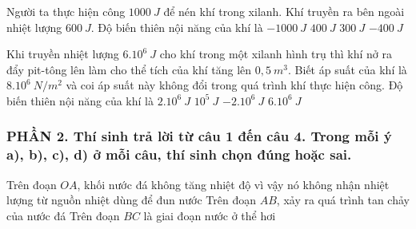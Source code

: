\begin{ex}
Người ta thực hiện công $1000\ J$ để nén khí trong xilanh. Khí truyền ra bên ngoài nhiệt lượng $600\ J$. Độ biến thiên nội năng của khí là
\choice
{$-1000\ J$}
{\True $400\ J$}
{$300\ J$}
{$-400\ J$}
\loigiai{}
\end{ex}

\begin{ex}
Khi truyền nhiệt lượng $6.10^{6}\ J$ cho khí trong một xilanh hình trụ thì khí nở ra đẩy pit-tông lên làm cho thể tích của khí tăng lên $0,5\ m^{3}$. Biết áp suất của khí là $8.10^{6}\ N/m^{2}$ và coi áp suất này không đổi trong quá trình khí thực hiện công. Độ biến thiên nội năng của khí là
\choice
{\True $2.10^{6}\ J$}
{$10^{5}\ J$}
{$-2.10^{6}\ J$}
{$6.10^{6}\ J$}
\loigiai{}
\end{ex}
\subsubsection*{PHẦN 2. Thí sinh trả lời từ câu 1 đến câu 4. Trong mỗi ý a), b), c), d) ở mỗi câu, thí sinh chọn đúng hoặc sai.}
\setcounter{ex}{0}
\begin{ex}
{Trên đoạn $OA$, khối nước đá không tăng nhiệt độ vì vậy nó không nhận nhiệt lượng từ nguồn nhiệt dùng để đun nước}
{Trên đoạn $AB$, xảy ra quá trình tan chảy của nước đá}
{Trên đoạn $BC$ là giai đoạn nước ở thể hơi}
	
\end{ex}

